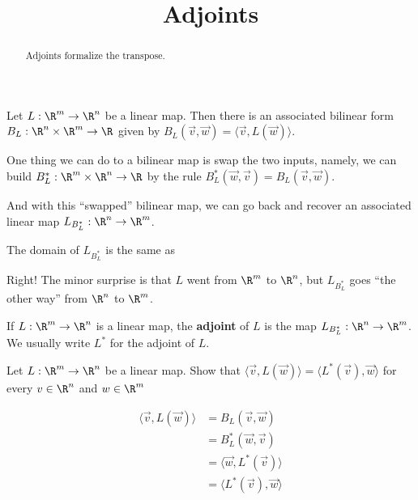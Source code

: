 \documentclass{ximera}
\title{Adjoints}
\begin{document}
\begin{abstract}
  Adjoints formalize the transpose.
\end{abstract}
	
Let $L: \R^m \to \R^n$ be a linear map.  Then there is an associated
bilinear form $B_L : \R^n \times \R^m \to \R$ given by
$B_L(\vec{v},\vec{w}) = \langle \vec{v}, L(\vec{w}) \rangle$.

One thing we can do to a bilinear map is swap the two inputs, namely,
we can build $B_L^*: \R^m \times \R^n \to \R$ by the rule $B_L^*
(\vec{w},\vec{v}) = B_L(\vec{v},\vec{w})$.

And with this ``swapped'' bilinear map, we can go back and recover an
associated linear map $L_{B_L^*} : \R^n \to \R^m$.

\begin{question}
  The domain of $L_{B_L^*}$ is the same as
  \begin{solution}
    \begin{multiple-choice}
    \end{multiple-choice}
  \end{solution}

  Right!  The minor surprise is that $L$ went from $\R^m$ to $\R^n$, but $L_{B_L^*}$ goes ``the other way'' from $\R^n$ to $\R^m$.
\end{question}


\begin{definition}
  If $L:\R^m \to \R^n$ is a linear map, the \textbf{adjoint} of $L$ is
  the map $L_{B_L^*} : \R^n \to \R^m$.  We usually write $L^*$ for the
  adjoint of $L$.
\end{definition}
		
Let $L: \R^m \to \R^n$ be a linear map.  
Show that $\langle \vec{v}, L(\vec{w})\rangle = \langle  L^*(\vec{v}),\vec{w}\rangle$ for every $v \in \R^n$ and $w \in \R^m$
\begin{free-response}
  \begin{align*}
    \langle \vec{v}, L(\vec{w})\rangle &= B_L(\vec{v},\vec{w})\\
    &= B_L^*(\vec{w},\vec{v})\\
    &=\langle \vec{w},L^*(\vec{v}) \rangle\\
    &=\langle L^*(\vec{v}), \vec{w}\rangle
  \end{align*}
\end{free-response}
\end{document}

